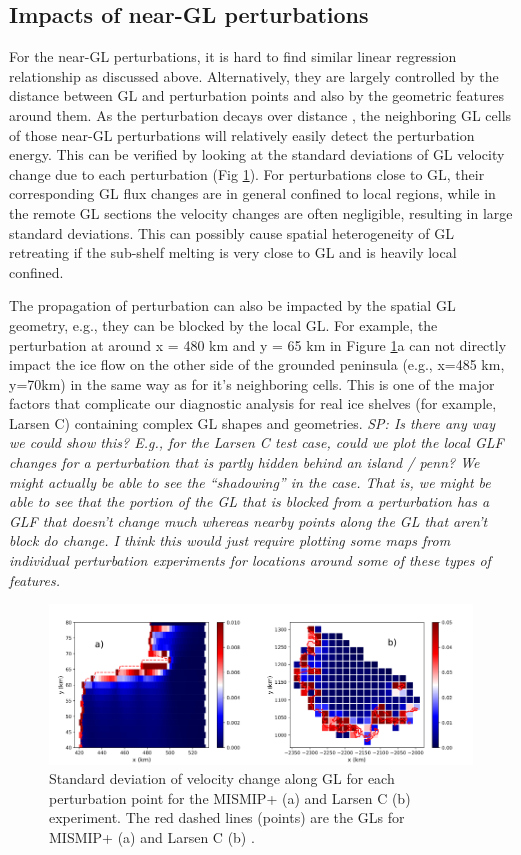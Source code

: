 \documentclass[review,oneside]{igs}
\begin{document}
\subsection{Impacts of near-GL perturbations}
For the near-GL perturbations, it is hard to find similar linear regression relationship as discussed above. Alternatively, they are largely controlled by the distance between GL and perturbation points and also by the geometric features around them. As the perturbation decays over distance \citep{lick1970}, the neighboring GL cells of those near-GL perturbations will relatively easily detect the perturbation energy. This can be verified by looking at the standard deviations of GL velocity change due to each perturbation (Fig \ref{fig8}). For perturbations close to GL, their corresponding GL flux changes are in general confined to local regions, while in the remote GL sections the velocity changes are often negligible, resulting in large standard deviations. This can possibly cause spatial heterogeneity of GL retreating if the sub-shelf melting is very close to GL and is heavily local confined. 

The propagation of perturbation can also be impacted by the spatial GL geometry, e.g., they can be blocked by the local GL. For example, the perturbation at around x = 480 km and y = 65 km in Figure \ref{fig8}a can not directly impact the ice flow on the other side of the grounded peninsula (e.g., x=485 km, y=70km) in the same way as for it's neighboring cells. This is one of the major factors that complicate our diagnostic analysis for real ice shelves (for example, Larsen C) containing complex GL shapes and geometries. \textit{SP: Is there any way we could show this? E.g., for the Larsen C test case, could we plot the local GLF changes for a perturbation that is partly hidden behind an island / penn? We might actually be able to see the ``shadowing'' in the case. That is, we might be able to see that the portion of the GL that is blocked from a perturbation has a GLF that doesn't change much whereas nearby points along the GL that aren't block do change. I think this would just require plotting some maps from individual perturbation experiments for locations around some of these types of features.}
 
\begin{figure}
	\centering
    \includegraphics[width=1\linewidth]{figs/fig8.pdf}
    \caption{Standard deviation of velocity change along GL for each perturbation point for the MISMIP+ (a) and Larsen C (b) experiment. The red dashed lines (points) are the GLs for MISMIP+ (a) and Larsen C (b) .}
	\label{fig8}
\end{figure}
\end{document}
